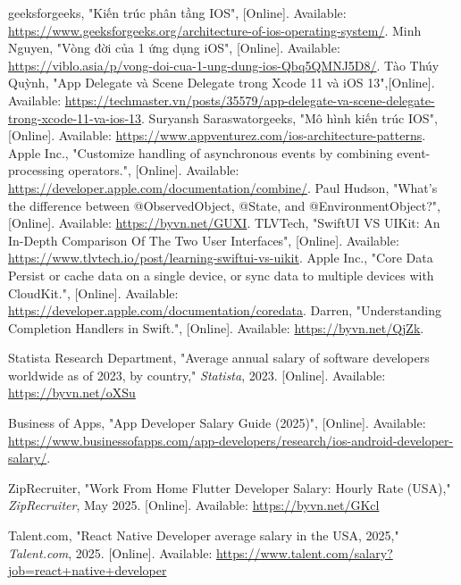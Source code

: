 \documentclass[12pt]{report}
\begin{document}
\begin{thebibliography}{1}
 geeksforgeeks, "Kiến trúc phân tầng IOS", [Online]. Available: \url{https://www.geeksforgeeks.org/architecture-of-ios-operating-system/}.
  Minh Nguyen, "Vòng đời của 1 ứng dụng iOS", [Online]. Available: \url{https://viblo.asia/p/vong-doi-cua-1-ung-dung-ios-Qbq5QMNJ5D8/}.
Tào Thúy Quỳnh, "App Delegate và Scene Delegate trong Xcode 11 và iOS 13",[Online]. Available: \url{https://techmaster.vn/posts/35579/app-delegate-va-scene-delegate-trong-xcode-11-va-ios-13}.
Suryansh Saraswatorgeeks, "Mô hình kiến trúc IOS", [Online]. Available: \url{https://www.appventurez.com/ios-architecture-patterns}.
Apple Inc., "Customize handling of asynchronous events by combining event-processing operators.", [Online]. Available: \url{https://developer.apple.com/documentation/combine/}.
 Paul Hudson, "What’s the difference between @ObservedObject, @State, and @EnvironmentObject?", [Online]. Available: \url{https://byvn.net/GUXI}.
 TLVTech, "SwiftUI VS UIKit: An In-Depth Comparison Of The Two User Interfaces", [Online]. Available: \url{https://www.tlvtech.io/post/learning-swiftui-vs-uikit}.
 Apple Inc., "Core Data Persist or cache data on a single device, or sync data to multiple devices with CloudKit.", [Online]. Available: \url{https://developer.apple.com/documentation/coredata}.
 Darren, "Understanding Completion Handlers in Swift.", [Online]. Available: \url{https://byvn.net/QjZk}.

    Statista Research Department, "Average annual salary of software developers worldwide as of 2023, by country," \emph{Statista}, 2023. [Online]. Available: \url{https://byvn.net/oXSu}

    Business of Apps, "App Developer Salary Guide (2025)", [Online]. Available: \url{https://www.businessofapps.com/app-developers/research/ios-android-developer-salary/}.

    ZipRecruiter, "Work From Home Flutter Developer Salary: Hourly Rate (USA)," \emph{ZipRecruiter}, May 2025. [Online]. Available: \url{https://byvn.net/GKcl}

    Talent.com, "React Native Developer average salary in the USA, 2025," \emph{Talent.com}, 2025. [Online]. Available: \url{https://www.talent.com/salary?job=react+native+developer}


\end{thebibliography}
\end{document}
